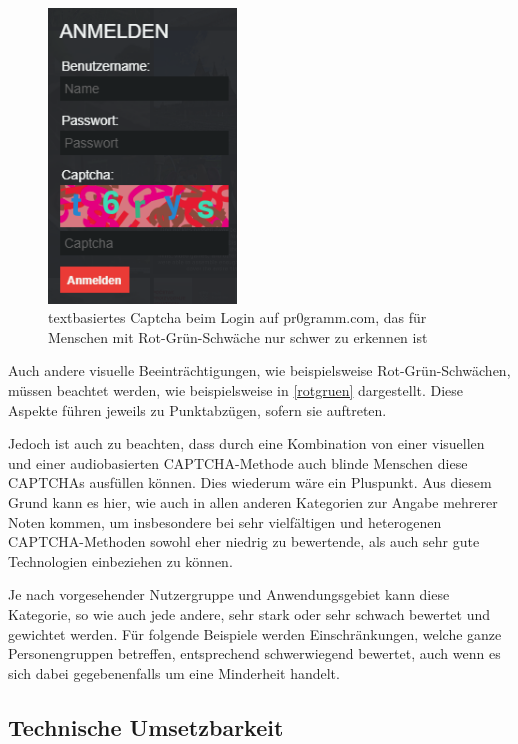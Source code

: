 \begin{figure}[h!]
    \centering
    \includegraphics[width=5cm]{gfx/mygraphics/pr0grammcaptcha.png}
    \caption{textbasiertes Captcha beim Login auf pr$0$gramm.com, das für Menschen mit Rot-Grün-Schwäche nur schwer zu erkennen ist}
    \label{rotgruen}
\end{figure}

\pagebreak

Auch andere visuelle Beeinträchtigungen, wie beispielsweise Rot-Grün-Schwächen, müssen beachtet werden,
wie beispielsweise in \autoref{rotgruen} dargestellt.
Diese Aspekte führen jeweils zu Punkt\-abzügen, sofern sie auftreten.

Jedoch ist auch zu beachten, dass durch eine Kombination von einer visuellen 
und einer audiobasierten CAPTCHA-Methode auch blinde Menschen diese CAPTCHAs ausfüllen können. 
Dies wiederum wäre ein Pluspunkt. 
Aus diesem Grund kann es hier, wie auch in allen anderen Kategorien zur Angabe mehrerer Noten kommen,
um insbesondere bei sehr vielfältigen und heterogenen CAPTCHA-Methoden sowohl eher niedrig zu bewertende, 
als auch sehr gute Technologien einbeziehen zu können.

Je nach vorgesehender Nutzergruppe und Anwendungsgebiet kann diese Kategorie, so wie auch jede andere, 
sehr stark oder sehr schwach bewertet und gewichtet werden.
Für folgende Beispiele werden Einschränkungen, welche ganze Personengruppen betreffen, entsprechend schwerwiegend bewertet,
auch wenn es sich dabei gegebenenfalls um eine Minderheit handelt.

\subsection{Technische Umsetzbarkeit}
\label{ch:matrix:aspekte:tu}

